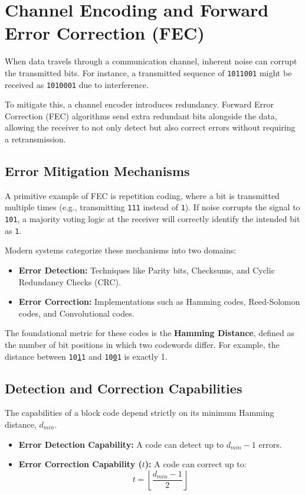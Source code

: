 \documentclass[10pt, conference]{IEEEtran}
\begin{document}
\section{\large \textbf{Channel Encoding and Forward Error Correction (FEC)}}

When data travels through a communication channel, inherent noise can corrupt the transmitted bits. For instance, a transmitted sequence of \texttt{1011001} might be received as \texttt{1010001} due to interference. 

To mitigate this, a channel encoder introduces redundancy. Forward Error Correction (FEC) algorithms send extra redundant bits alongside the data, allowing the receiver to not only detect but also correct errors without requiring a retransmission. 

\subsection{\textbf{Error Mitigation Mechanisms}}
A primitive example of FEC is repetition coding, where a bit is transmitted multiple times (e.g., transmitting \texttt{111} instead of \texttt{1}). If noise corrupts the signal to \texttt{101}, a majority voting logic at the receiver will correctly identify the intended bit as \texttt{1}. 

Modern systems categorize these mechanisms into two domains:
\begin{itemize}
    \item \textbf{Error Detection:} Techniques like Parity bits, Checksums, and Cyclic Redundancy Checks (CRC).
    \item \textbf{Error Correction:} Implementations such as Hamming codes, Reed-Solomon codes, and Convolutional codes.
\end{itemize}

The foundational metric for these codes is the \textbf{Hamming Distance}, defined as the number of bit positions in which two codewords differ. For example, the distance between \texttt{10\underline{1}1} and \texttt{10\underline{0}1} is exactly 1.

\subsection{\textbf{Detection and Correction Capabilities}}
The capabilities of a block code depend strictly on its minimum Hamming distance, $d_{min}$.
\begin{itemize}
    \item \textbf{Error Detection Capability:} A code can detect up to $d_{min} - 1$ errors.
    \item \textbf{Error Correction Capability ($t$):} A code can correct up to:
    \begin{equation}
        t = \left\lfloor \frac{d_{min} - 1}{2} \right\rfloor
    \end{equation}
\end{itemize}
\end{document}
